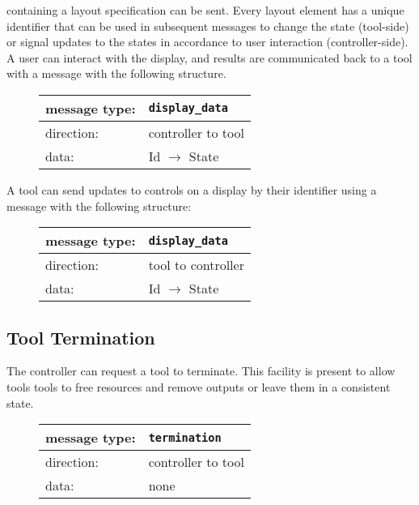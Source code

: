 \documentclass{article}
\newcommand{\msg}[1]{\texttt{#1}}
\begin{document}
   \noindent containing a layout specification can be sent. Every layout
   element has a unique identifier that can be used in subsequent messages to
   change the state (tool-side) or signal updates to the states in accordance
   to user interaction (controller-side).  A user can interact with the
   display, and results are communicated back to a tool with a message with the
   following structure.

   \begin{figure}[H]
    \begin{center}
     \begin{tabular}{|ll|}
      \hline
       message type:   & \msg{display\_data} \\
      \hline
       direction:      & controller to tool \\
       data:           & Id $\rightarrow$ State \\
      \hline
     \end{tabular}
    \end{center}
   \end{figure}

   \noindent A tool can send updates to controls on a display by their
   identifier using a message with the following structure:

   \begin{figure}[H]
    \begin{center}
     \begin{tabular}{|ll|}
      \hline
       message type:   & \msg{display\_data} \\
      \hline
       direction:      & tool to controller \\
       data:           & Id $\rightarrow$ State \\
      \hline
     \end{tabular}
    \end{center}
   \end{figure}

  \subsection{Tool Termination}

   \noindent The controller can request a tool to terminate. This facility is present to
   allow tools tools to free resources and remove outputs or leave them in a
   consistent state.

   \begin{figure}[H]
    \begin{center}
     \begin{tabular}{|ll|}
      \hline
       message type:    & \msg{termination} \\
      \hline
       direction:       & controller to tool \\
       data:            & none \\
      \hline
     \end{tabular}
    \end{center}
   \end{figure}
\end{document}
